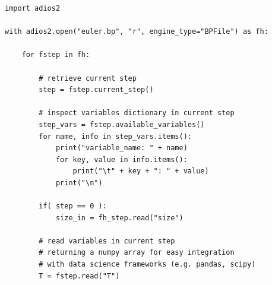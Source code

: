 

\begin{minipage}{\linewidth}
\begin{lstlisting}[frame=single,label={pythonAPI},caption={Python High-Level API Read Example}]
import adios2

with adios2.open("euler.bp", "r", engine_type="BPFile") as fh:

    for fstep in fh:
        
        # retrieve current step
        step = fstep.current_step()

        # inspect variables dictionary in current step 
        step_vars = fstep.available_variables()
        for name, info in step_vars.items():
            print("variable_name: " + name)
            for key, value in info.items():
                print("\t" + key + ": " + value)
            print("\n")

        if( step == 0 ):
            size_in = fh_step.read("size")

        # read variables in current step
        # returning a numpy array for easy integration
        # with data science frameworks (e.g. pandas, scipy)
        T = fstep.read("T")
        
\end{lstlisting}
\end{minipage}






